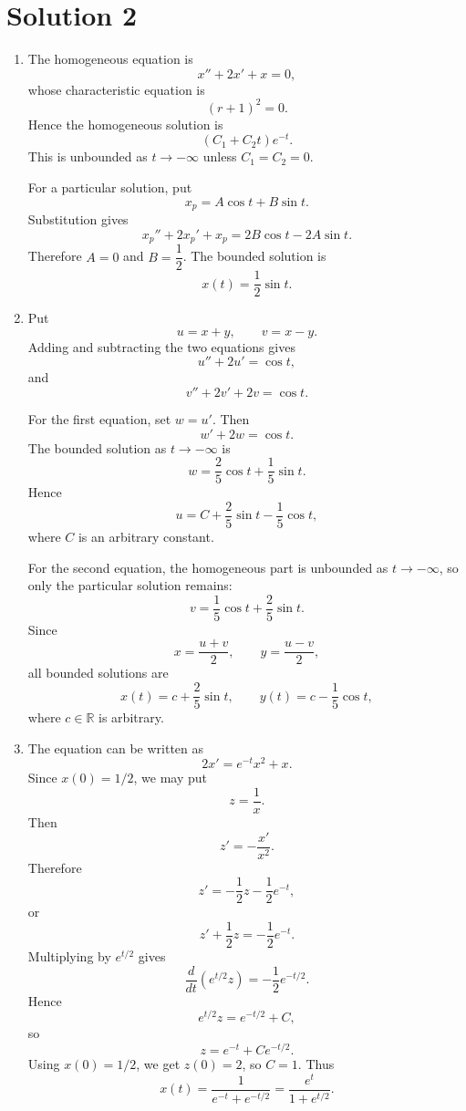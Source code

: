 \documentclass[10pt,a4paper]{article}
\begin{document}
\section*{Solution 2}

\begin{enumerate}
  \item The homogeneous equation is
        \[
          x''+2x'+x=0,
        \]
        whose characteristic equation is
        \[
          (r+1)^2=0.
        \]
        Hence the homogeneous solution is
        \[
          (C_1+C_2t)e^{-t}.
        \]
        This is unbounded as $t\to-\infty$ unless $C_1=C_2=0$.

        For a particular solution, put
        \[
          x_p=A\cos t+B\sin t.
        \]
        Substitution gives
        \[
          x_p''+2x_p'+x_p
          =
          2B\cos t-2A\sin t.
        \]
        Therefore $A=0$ and $B=\dfrac12$. The bounded solution is
        \[
          \boxed{x(t)=\frac12\sin t.}
        \]

  \item Put
        \[
          u=x+y,\qquad v=x-y.
        \]
        Adding and subtracting the two equations gives
        \[
          u''+2u'=\cos t,
        \]
        and
        \[
          v''+2v'+2v=\cos t.
        \]

        For the first equation, set $w=u'$. Then
        \[
          w'+2w=\cos t.
        \]
        The bounded solution as $t\to-\infty$ is
        \[
          w=\frac25\cos t+\frac15\sin t.
        \]
        Hence
        \[
          u=C+\frac25\sin t-\frac15\cos t,
        \]
        where $C$ is an arbitrary constant.

        For the second equation, the homogeneous part is unbounded as $t\to-\infty$, so only the particular solution remains:
        \[
          v=\frac15\cos t+\frac25\sin t.
        \]
        Since
        \[
          x=\frac{u+v}{2},
          \qquad
          y=\frac{u-v}{2},
        \]
        all bounded solutions are
        \[
          \boxed{
          x(t)=c+\frac25\sin t,\qquad
          y(t)=c-\frac15\cos t,}
        \]
        where $c\in\mathbb{R}$ is arbitrary.

  \item The equation can be written as
        \[
          2x'=e^{-t}x^2+x.
        \]
        Since $x(0)=1/2$, we may put
        \[
          z=\frac1x.
        \]
        Then
        \[
          z'=-\frac{x'}{x^2}.
        \]
        Therefore
        \[
          z'
          =
          -\frac12z-\frac12e^{-t},
        \]
        or
        \[
          z'+\frac12z=-\frac12e^{-t}.
        \]
        Multiplying by $e^{t/2}$ gives
        \[
          \frac{d}{dt}\left(e^{t/2}z\right)
          =
          -\frac12e^{-t/2}.
        \]
        Hence
        \[
          e^{t/2}z=e^{-t/2}+C,
        \]
        so
        \[
          z=e^{-t}+Ce^{-t/2}.
        \]
        Using $x(0)=1/2$, we get $z(0)=2$, so $C=1$. Thus
        \[
          \boxed{
          x(t)=\frac{1}{e^{-t}+e^{-t/2}}
          =
          \frac{e^t}{1+e^{t/2}}.}
        \]
\end{enumerate}
\end{document}

